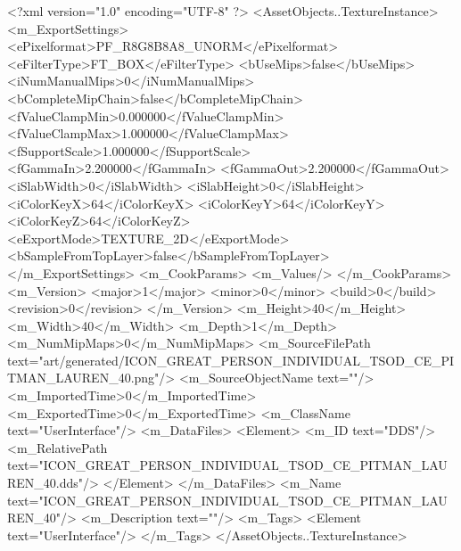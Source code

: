 <?xml version="1.0" encoding="UTF-8" ?>
<AssetObjects..TextureInstance>
	<m_ExportSettings>
		<ePixelformat>PF_R8G8B8A8_UNORM</ePixelformat>
		<eFilterType>FT_BOX</eFilterType>
		<bUseMips>false</bUseMips>
		<iNumManualMips>0</iNumManualMips>
		<bCompleteMipChain>false</bCompleteMipChain>
		<fValueClampMin>0.000000</fValueClampMin>
		<fValueClampMax>1.000000</fValueClampMax>
		<fSupportScale>1.000000</fSupportScale>
		<fGammaIn>2.200000</fGammaIn>
		<fGammaOut>2.200000</fGammaOut>
		<iSlabWidth>0</iSlabWidth>
		<iSlabHeight>0</iSlabHeight>
		<iColorKeyX>64</iColorKeyX>
		<iColorKeyY>64</iColorKeyY>
		<iColorKeyZ>64</iColorKeyZ>
		<eExportMode>TEXTURE_2D</eExportMode>
		<bSampleFromTopLayer>false</bSampleFromTopLayer>
	</m_ExportSettings>
	<m_CookParams>
		<m_Values/>
	</m_CookParams>
	<m_Version>
		<major>1</major>
		<minor>0</minor>
		<build>0</build>
		<revision>0</revision>
	</m_Version>
	<m_Height>40</m_Height>
	<m_Width>40</m_Width>
	<m_Depth>1</m_Depth>
	<m_NumMipMaps>0</m_NumMipMaps>
	<m_SourceFilePath text="art/generated/ICON_GREAT_PERSON_INDIVIDUAL_TSOD_CE_PITMAN_LAUREN_40.png"/>
	<m_SourceObjectName text=""/>
	<m_ImportedTime>0</m_ImportedTime>
	<m_ExportedTime>0</m_ExportedTime>
	<m_ClassName text="UserInterface"/>
	<m_DataFiles>
		<Element>
			<m_ID text="DDS"/>
			<m_RelativePath text="ICON_GREAT_PERSON_INDIVIDUAL_TSOD_CE_PITMAN_LAUREN_40.dds"/>
		</Element>
	</m_DataFiles>
	<m_Name text="ICON_GREAT_PERSON_INDIVIDUAL_TSOD_CE_PITMAN_LAUREN_40"/>
	<m_Description text=""/>
	<m_Tags>
		<Element text="UserInterface"/>
	</m_Tags>
</AssetObjects..TextureInstance>
